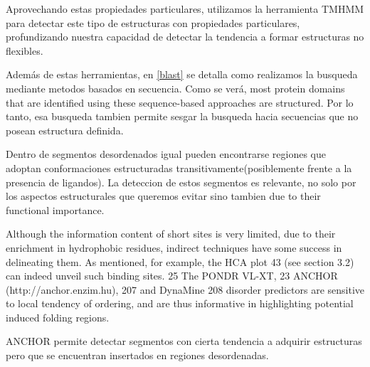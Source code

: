 Aprovechando estas propiedades particulares, utilizamos la herramienta TMHMM para detectar este tipo de estructuras con propiedades particulares, profundizando nuestra capacidad de detectar la tendencia a formar estructuras no flexibles.





Además de estas herramientas, en \ref{blast} se detalla como realizamos la busqueda mediante metodos basados en secuencia. 
Como se verá, most protein domains that are identified using these sequence-based approaches are structured.
Por lo tanto, esa busqueda tambien permite sesgar la busqueda hacia secuencias que no posean estructura definida.








Dentro de segmentos desordenados igual pueden encontrarse regiones que adoptan conformaciones estructuradas transitivamente(posiblemente frente a la presencia de ligandos).
La deteccion de estos segmentos es relevante, no solo por los aspectos estructurales que queremos evitar %
sino tambien due to their functional importance. %

Although the information content of short sites is very limited, due to their enrichment in hydrophobic residues, indirect techniques have
some success in delineating them. As mentioned, for example, the HCA plot 43 (see section 3.2) can indeed unveil such binding
sites. 25 The PONDR VL-XT, 23 ANCHOR (http://anchor.enzim.hu), 207 and DynaMine 208 disorder predictors are sensitive
to local tendency of ordering, and are thus informative in highlighting potential induced folding regions.




ANCHOR permite detectar segmentos con cierta tendencia a adquirir estructuras pero que se encuentran insertados en regiones desordenadas.









